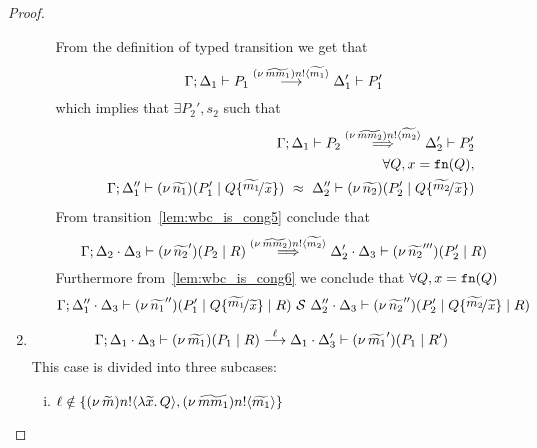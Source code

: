 \begin{proof}
\begin{enumerate}
\begin{enumerate}[i.]
							\noi From the definition of typed transition we get that
							\[
								\Gamma; \Delta_1 \vdash P_1 \stackrel{(\nu\, \widetilde{mm_1}) n ! \langle \widetilde{m_1} \rangle}{\longrightarrow} \Delta_1' \vdash P_1'
							\]
							\noi which implies that $\exists P_2', s_2$ such that
							\begin{eqnarray}
								&& \horel{\Gamma}{\Delta_1}{P_2}
								{\By{\news{\widetilde{mm_2}} \bactout{n}{\widetilde{m_2}}}}
								{\Delta_2'}{P_2'}
								\label{lem:wbc_is_cong5}\\
								&&\forall Q, x = \fn{Q}, \nonumber \\%
								&& \horel{\Gamma}{\Delta_1''}{\newsp{\widetilde{n_1}}{P_1' \Par Q \subst{\widetilde{m_1}}{\widetilde{x}}}}
								{\ \wbc\ }
								{\Delta_2''}{\newsp{\widetilde{n_2}}{P_2' \Par Q \subst{\widetilde{m_2}}{\widetilde{x}}}}
								\label{lem:wbc_is_cong6}
							\end{eqnarray}
						\noi From transition~\eqref{lem:wbc_is_cong5} conclude that 
						\[
							\Gamma; \Delta_2 \cdot \Delta_3 \vdash (\nu\, \widetilde{n_2}')(P_2 \;|\; R) \stackrel{(\nu\, \widetilde{mm_2}) n ! \langle \widetilde{m_2} \rangle}{\Longrightarrow} \Delta_2' \cdot \Delta_3 \vdash (\nu\, \widetilde{n_2}''')(P_2' \;|\; R)
						\]
						\noi Furthermore from~\eqref{lem:wbc_is_cong6} we conclude that $\forall Q, x = \mathtt{fn}(Q)$
						\[
							\horel{\Gamma}{\Delta_1'' \cat \Delta_3}{\newsp{\widetilde{n_1}''}{P_1' \Par Q \subst{\widetilde{m_1}}{\widetilde{x}} \Par R}}
							{\ \mathcal{S}\ }
							{\Delta_2'' \cat \Delta_3}{\newsp{\widetilde{n_2}''}{P_2' \Par Q \subst{\widetilde{m_2}}{\widetilde{x}} \Par R}}
						\]
				\end{enumerate}

		\item
				\[
					\Gamma; \Delta_1 \cdot \Delta_3 \vdash (\nu\, \widetilde{m_1})(P_1 \;|\; R) \stackrel{\ell}{\longrightarrow} \Delta_1 \cdot \Delta_3' \vdash (\nu\, \widetilde{m_1}')(P_1 \;|\; R')
				\]
				\noi This case is divided into three subcases:

				\begin{enumerate}[i.]
					\item

							$\ell \notin \{(\nu\, \widetilde{m}) n ! \langle \lambda \widetilde{x}.\,Q \rangle, (\nu\, \widetilde{mm_1}) n ! \langle \widetilde{m_1} \rangle\}$


\end{enumerate}
\end{enumerate}
\end{proof}
